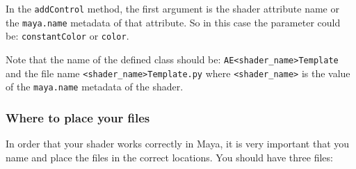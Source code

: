 \inputminted[mathescape,
linenos,
numbersep=5pt,
frame=lines,
framesep=2mm,
baselinestretch=1,
fontsize=\footnotesize,
tabsize=3,
label=mySimpleTemplate.py]
{python}{mySimpleTemplate.py}

In the \texttt{addControl} method, the first argument is the shader attribute name or the \texttt{maya.name} metadata of that attribute.
So in this case the parameter could be: \texttt{constantColor} or \texttt{color}.

Note that the name of the defined class should be: \verb|AE<shader_name>Template| and the file name \verb|<shader_name>Template.py| where \verb|<shader_name>| is the value of the \verb|maya.name| metadata of the shader.

\subsubsection{Where to place your files}

In order that your shader works correctly in Maya, it is very important that you name and place the files in the correct locations. You should have three files:

